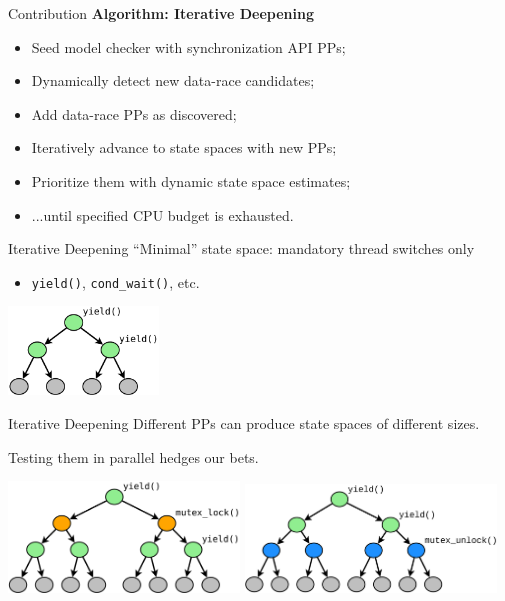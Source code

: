 \documentclass[xcolor=dvipsnames]{beamer}
\begin{document}


\begin{frame}{Contribution}
	\textbf{Algorithm: Iterative Deepening}
	\begin{itemize}
		\item Seed model checker with synchronization API PPs;
		\item Dynamically detect new data-race candidates;
		\item Add data-race PPs as discovered;
		\item Iteratively advance to state spaces with new PPs;
		\item Prioritize them with dynamic state space estimates;
		\item ...until specified CPU budget is exhausted.
	\end{itemize}
\end{frame}

\begin{frame}{Iterative Deepening}
	``Minimal'' state space: mandatory thread switches only
	\begin{itemize}
		\item \texttt{yield()}, \texttt{cond\_wait()}, etc.
	\end{itemize}
	\linegap

	\begin{center}
		\includegraphics[width=0.3\textwidth]{tree0.pdf}
	\end{center}
\end{frame}

\begin{frame}{Iterative Deepening}
	Different PPs can produce state spaces of different sizes.
	\linegap

	Testing them in parallel hedges our bets.
	\linegap

	\begin{center}
		\includegraphics[width=0.46\textwidth]{tree1.pdf}
		\quad
		\includegraphics[width=0.50\textwidth]{tree2.pdf}
	\end{center}
\end{frame}
\end{document}
